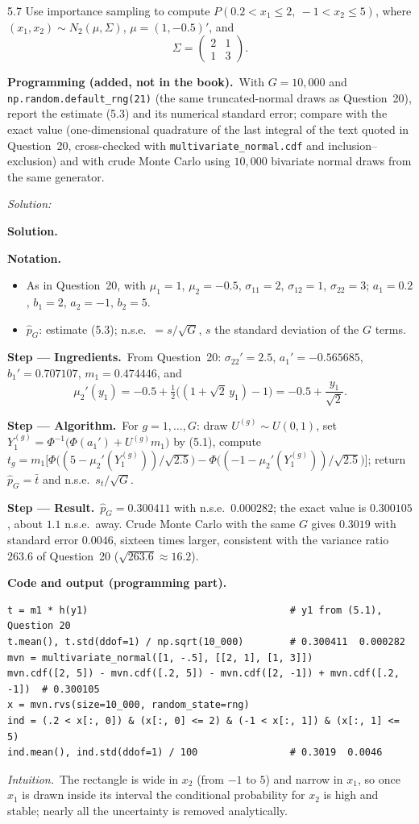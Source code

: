 \documentclass[11pt,a4paper]{article}
\newif\ifsolucoes
\newcommand{\espacoresol}{4.5cm}   %
\numberwithin{equation}{questao}   %
\newcommand{\programacao}{\par\smallskip\noindent\textbf{Programming (added, not in the book).}~}
\newenvironment{notacao}{\par\smallskip\noindent\textbf{Notation.}\begin{itemize}[leftmargin=1.4em,topsep=1pt,itemsep=0pt]\small}{\end{itemize}}
\newcommand{\resolespaco}{\ifsolucoes\else\par\textit{Solution:}\vspace{\espacoresol}\par\fi}
\newcommand{\passo}[2]{\par\smallskip\noindent\textbf{Step --- #1.}~#2}
\newcommand{\intuicao}[1]{\par\smallskip\noindent\textit{Intuition.}~#1}
\newcommand{\refbib}[1]{\par\smallskip\noindent{\footnotesize\color{black!60}\textbf{Ref:} #1}}
\newcommand{\solhead}{\par\medskip\noindent{\color{blue!55!black}\rule{\linewidth}{0.3pt}}\par\noindent\textbf{Solution.}}
\newcommand{\codehead}{\par\smallskip\noindent\textbf{Code and output (programming part).}\par}
\newcommand{\1}{\mathbf{1}}
\begin{document}
5.7 Use importance sampling to compute $P(0.2<x_1\le2,\ -1<x_2\le5)$, where
$(x_1,x_2)\sim N_2(\mu,\Sigma)$, $\mu=(1,-0.5)'$, and
\[
\Sigma=\begin{pmatrix}2&1\\1&3\end{pmatrix}.
\]
\programacao With $G=10{,}000$ and \texttt{np.random.default\_rng(21)} (the same truncated-normal
draws as Question~20), report the estimate (5.3) and its numerical standard error; compare with
the exact value (one-dimensional quadrature of the last integral of the text quoted in
Question~20, cross-checked with
\texttt{multivariate\_normal.cdf} and inclusion--exclusion) and with crude Monte Carlo using
$10{,}000$ bivariate normal draws from the same generator.
\resolespaco
\begin{sol}
\solhead
\begin{notacao}
\item As in Question~20, with $\mu_1=1$, $\mu_2=-0.5$, $\sigma_{11}=2$, $\sigma_{12}=1$, $\sigma_{22}=3$; $a_1=0.2$, $b_1=2$, $a_2=-1$, $b_2=5$.
\item $\hat p_G$: estimate (5.3); n.s.e.\ $=s/\sqrt G$, $s$ the standard deviation of the $G$ terms.
\end{notacao}

\passo{Ingredients}{From Question~20: $\sigma_{22}'=2.5$, $a_1'=-0.565685$, $b_1'=0.707107$,
$m_1=0.474446$, and}
\[
\mu_2'(y_1)=-0.5+\tfrac12\big((1+\sqrt2\,y_1)-1\big)=-0.5+\frac{y_1}{\sqrt2}.
\]

\passo{Algorithm}{For $g=1,\dots,G$: draw $U^{(g)}\sim U(0,1)$, set
$Y_1^{(g)}=\Phi^{-1}\big(\Phi(a_1')+U^{(g)}m_1\big)$ by (5.1), compute
$t_g=m_1\big[\Phi\big((5-\mu_2'(Y_1^{(g)}))/\sqrt{2.5}\big)-\Phi\big((-1-\mu_2'(Y_1^{(g)}))/\sqrt{2.5}\big)\big]$; return
$\hat p_G=\bar t$ and n.s.e.\ $s_t/\sqrt G$.}

\passo{Result}{$\hat p_G=0.300411$ with n.s.e.\ $0.000282$; the exact value is $0.300105$, about
$1.1$ n.s.e.\ away. Crude Monte Carlo with the same $G$ gives $0.3019$ with standard error $0.0046$,
sixteen times larger, consistent with the variance ratio $263.6$ of Question~20
($\sqrt{263.6}\approx16.2$).}

\codehead
{\small
\begin{verbatim}
t = m1 * h(y1)                                   # y1 from (5.1), Question 20
t.mean(), t.std(ddof=1) / np.sqrt(10_000)        # 0.300411  0.000282
mvn = multivariate_normal([1, -.5], [[2, 1], [1, 3]])
mvn.cdf([2, 5]) - mvn.cdf([.2, 5]) - mvn.cdf([2, -1]) + mvn.cdf([.2, -1])  # 0.300105
x = mvn.rvs(size=10_000, random_state=rng)
ind = (.2 < x[:, 0]) & (x[:, 0] <= 2) & (-1 < x[:, 1]) & (x[:, 1] <= 5)
ind.mean(), ind.std(ddof=1) / 100                # 0.3019  0.0046
\end{verbatim}
}

\intuicao{The rectangle is wide in $x_2$ (from $-1$ to $5$) and narrow in $x_1$, so once $x_1$ is
drawn inside its interval the conditional probability for $x_2$ is high and stable; nearly all the
uncertainty is removed analytically.}
\refbib{Greenberg (2008), §5.4 (pp.~70--72).}
\end{sol}
\end{document}
